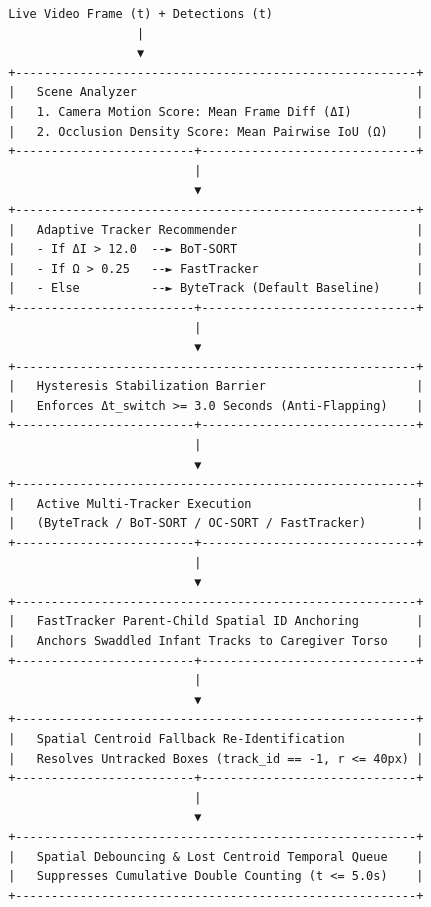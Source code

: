 \begin{verbatim}
       Live Video Frame (t) + Detections (t)
                         |
                         ▼
       +--------------------------------------------------------+
       |   Scene Analyzer                                       |
       |   1. Camera Motion Score: Mean Frame Diff (ΔI)         |
       |   2. Occlusion Density Score: Mean Pairwise IoU (Ω)    |
       +-------------------------+------------------------------+
                                 |
                                 ▼
       +--------------------------------------------------------+
       |   Adaptive Tracker Recommender                         |
       |   - If ΔI > 12.0  --► BoT-SORT                         |
       |   - If Ω > 0.25   --► FastTracker                      |
       |   - Else          --► ByteTrack (Default Baseline)     |
       +-------------------------+------------------------------+
                                 |
                                 ▼
       +--------------------------------------------------------+
       |   Hysteresis Stabilization Barrier                     |
       |   Enforces Δt_switch >= 3.0 Seconds (Anti-Flapping)    |
       +-------------------------+------------------------------+
                                 |
                                 ▼
       +--------------------------------------------------------+
       |   Active Multi-Tracker Execution                       |
       |   (ByteTrack / BoT-SORT / OC-SORT / FastTracker)       |
       +-------------------------+------------------------------+
                                 |
                                 ▼
       +--------------------------------------------------------+
       |   FastTracker Parent-Child Spatial ID Anchoring        |
       |   Anchors Swaddled Infant Tracks to Caregiver Torso    |
       +-------------------------+------------------------------+
                                 |
                                 ▼
       +--------------------------------------------------------+
       |   Spatial Centroid Fallback Re-Identification          |
       |   Resolves Untracked Boxes (track_id == -1, r <= 40px) |
       +-------------------------+------------------------------+
                                 |
                                 ▼
       +--------------------------------------------------------+
       |   Spatial Debouncing & Lost Centroid Temporal Queue    |
       |   Suppresses Cumulative Double Counting (t <= 5.0s)    |
       +--------------------------------------------------------+
\end{verbatim}

